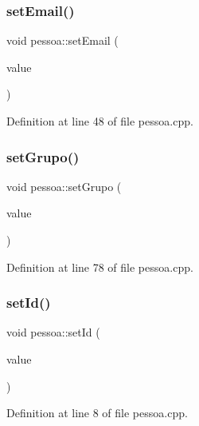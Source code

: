 \hypertarget{classpessoa_a79249a39e2a46cca19acef0476c34bf2}{}\label{classpessoa_a79249a39e2a46cca19acef0476c34bf2} 
\subsubsection{\texorpdfstring{set\+Email()}{setEmail()}}
{\footnotesize\ttfamily void pessoa\+::set\+Email (\begin{DoxyParamCaption}\item[{const Q\+String \&}]{value }\end{DoxyParamCaption})}



Definition at line 48 of file pessoa.\+cpp.

\hypertarget{classpessoa_abde4772449869bd2c8e5e6d280e4f9f5}{}\label{classpessoa_abde4772449869bd2c8e5e6d280e4f9f5} 
\subsubsection{\texorpdfstring{set\+Grupo()}{setGrupo()}}
{\footnotesize\ttfamily void pessoa\+::set\+Grupo (\begin{DoxyParamCaption}\item[{int}]{value }\end{DoxyParamCaption})}



Definition at line 78 of file pessoa.\+cpp.

\hypertarget{classpessoa_ab528a41c403719b847f8e43c0893e14c}{}\label{classpessoa_ab528a41c403719b847f8e43c0893e14c} 
\subsubsection{\texorpdfstring{set\+Id()}{setId()}}
{\footnotesize\ttfamily void pessoa\+::set\+Id (\begin{DoxyParamCaption}\item[{int}]{value }\end{DoxyParamCaption})}



Definition at line 8 of file pessoa.\+cpp.

\hypertarget{classpessoa_a1212ac1dfede6a2a83adf84be6b9c321}{}\label{classpessoa_a1212ac1dfede6a2a83adf84be6b9c321} 
